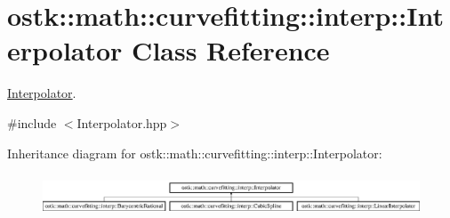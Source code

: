 \hypertarget{classostk_1_1math_1_1curvefitting_1_1interp_1_1_interpolator}{}\section{ostk\+:\+:math\+:\+:curvefitting\+:\+:interp\+:\+:Interpolator Class Reference}
\label{classostk_1_1math_1_1curvefitting_1_1interp_1_1_interpolator}


\hyperlink{classostk_1_1math_1_1curvefitting_1_1interp_1_1_interpolator}{Interpolator}.  




{\ttfamily \#include $<$Interpolator.\+hpp$>$}

Inheritance diagram for ostk\+:\+:math\+:\+:curvefitting\+:\+:interp\+:\+:Interpolator\+:\begin{figure}[H]
\begin{center}
\leavevmode
\includegraphics[height=1.252796cm]{classostk_1_1math_1_1curvefitting_1_1interp_1_1_interpolator}
\end{center}
\end{figure}
